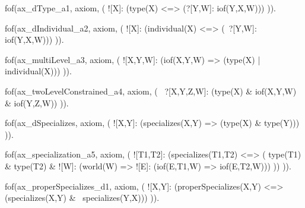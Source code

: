 fof(ax_dType_a1, axiom, (
  ![X]: (type(X) <=> (?[Y,W]: iof(Y,X,W)))
)).

fof(ax_dIndividual_a2, axiom, (
  ![X]: (individual(X) <=> (~?[Y,W]: iof(Y,X,W)))
)).


fof(ax_multiLevel_a3, axiom, (
  ![X,Y,W]: (iof(X,Y,W) => (type(X) | individual(X)))
)).

fof(ax_twoLevelConstrained_a4, axiom, (
  ~?[X,Y,Z,W]: (type(X) & iof(X,Y,W) & iof(Y,Z,W))
)).







fof(ax_dSpecializes, axiom, (
  ![X,Y]: (specializes(X,Y) => (type(X) & type(Y)))
)).

fof(ax_specialization_a5, axiom, (
  ![T1,T2]: (specializes(T1,T2) <=> (
    type(T1) & type(T2) & ![W]: (world(W) => ![E]: (iof(E,T1,W) => iof(E,T2,W)))
  ))
)).

fof(ax_properSpecializes_d1, axiom, (
  ![X,Y]: (properSpecializes(X,Y) <=> (specializes(X,Y) & ~specializes(Y,X)))
)).






